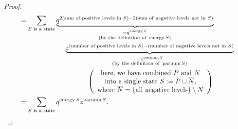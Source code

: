 \begin{proof}
\begin{align}
&  =\sum_{S\text{ is a state}}\underbrace{q^{2\left(  \text{sum of positive
levels in }S\right)  -2\left(  \text{sum of negative levels not in }S\right)
}}_{\substack{=q^{\operatorname*{energy}S}\\\text{(by the definition of
}\operatorname*{energy}S\text{)}}}\nonumber\\
&  \ \ \ \ \ \ \ \ \ \ \ \ \ \ \ \ \ \ \ \ \underbrace{z^{\left(  \text{number
of positive levels in }S\right)  -\left(  \text{number of negative levels not
in }S\right)  }}_{\substack{=z^{\operatorname*{parnum}S}\\\text{(by the
definition of }\operatorname*{parnum}S\text{)}}}\nonumber\\
&  \ \ \ \ \ \ \ \ \ \ \ \ \ \ \ \ \ \ \ \ \ \ \ \ \ \ \ \ \ \ \left(
\begin{array}
[c]{c}%
\text{here, we have combined }P\text{ and }N\\
\text{into a single state }S:=P\cup\overline{N}\text{,}\\
\text{where }\overline{N}=\left\{  \text{all negative levels}\right\}
\setminus N
\end{array}
\right) \nonumber\\
&  =\sum_{S\text{ is a state}}q^{\operatorname*{energy}S}%
z^{\operatorname*{parnum}S}. \label{pf.thm.pars.jtp2.lhs}%
\end{align}



\end{proof}
